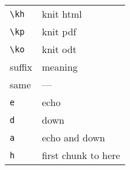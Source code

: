 \documentclass[a4paper]{article}
\newcommand{\rcmd}[1]{\texttt{\textbackslash #1}}
\begin{document}
\begin{minipage}[t]{0.33\textwidth}
\begin{tabular}{l l}
    \midrule
    \rcmd{kh}             & knit html           \\
    \rcmd{kp}             & knit pdf            \\
    \rcmd{ko}             & knit odt            \\
    \midrule
    \midrule
    suffix                & meaning             \\
    \midrule
    same                  & ---                 \\
    \texttt{e}            & echo                \\
    \texttt{d}            & down                \\
    \texttt{a}            & echo and down       \\
    \texttt{h}            & first chunk to here \\
    \bottomrule
  \end{tabular}
\end{minipage}
%
\end{document}
